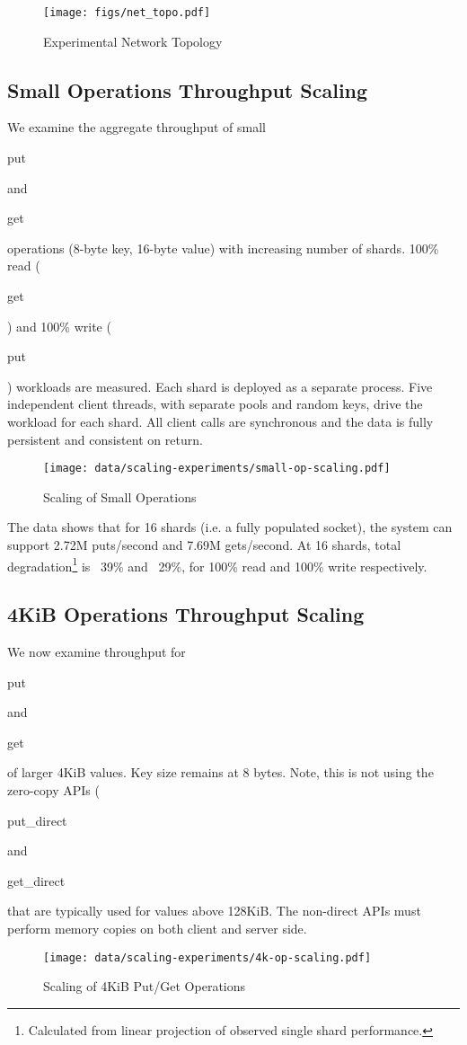 \documentclass[letterpaper,twocolumn,10pt]{article}
\newcommand{\code}[1]{\begin{ttcodefont}#1\end{ttcodefont}}
\begin{document}
\begin{figure}[]
\centering
\texttt{[image: figs/net\_topo.pdf]}
\caption{Experimental Network Topology}
\label{fig:net_top}
\end{figure}

\subsection{Small Operations Throughput Scaling}

We examine the aggregate throughput of small \code{put} and \code{get}
operations (8-byte key, 16-byte value) with increasing number of
shards.  100\% read (\code{get}) and 100\% write (\code{put})
workloads are measured. Each shard is deployed as a separate process.
Five independent client threads, with separate pools and random keys,
drive the workload for each shard.  All client calls are synchronous
and the data is fully persistent and consistent on return.

\begin{figure}[ht]
\centering
\texttt{[image: data/scaling-experiments/small-op-scaling.pdf]}
\caption{Scaling of Small Operations}
\label{plot:smallop}
\end{figure}

The data shows that for 16 shards (i.e. a fully populated socket), the
system can support 2.72M puts/second and 7.69M gets/second.  At 16
shards, total degradation\footnote{Calculated from linear projection
  of observed single shard performance.} is ~39\% and ~29\%, for 100\%
read and 100\% write respectively.

\subsection{4KiB Operations Throughput Scaling}

We now examine throughput for \code{put} and \code{get} of larger 4KiB
values.  Key size remains at 8 bytes.  Note, this is not using the
zero-copy APIs (\code{put\_direct} and \code{get\_direct} that are
typically used for values above 128KiB.  The non-direct APIs must perform
memory copies on both client and server side.

\begin{figure}[ht!]
\centering
\texttt{[image: data/scaling-experiments/4k-op-scaling.pdf]}
\caption{Scaling of 4KiB Put/Get Operations}
\label{plot:4kop}
\end{figure}
\end{document}
